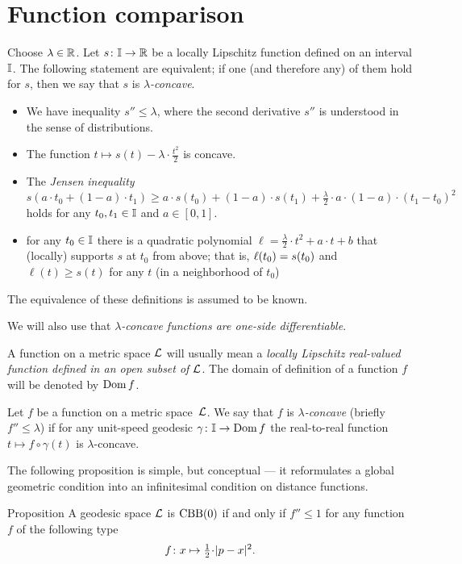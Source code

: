 \section{Function comparison}\label{Function comparison}

Choose $\lambda\in \mathbb{R}$.
Let $s\colon\mathbb{I}\to\mathbb{R}$ be a locally Lipschitz function defined on an interval $\mathbb{I}$.
The following statement are equivalent;
if one (and therefore any) of them hold for $s$, then we say that $s$ is \emph{$\lambda$-concave}.
\begin{itemize}
\item We have inequality $s''\le \lambda$, where the second derivative $s''$ is understood in the sense of distributions.
\item The function $t\mapsto s(t)-\lambda\cdot\tfrac{t^2}2$ is concave.
\item The \emph{Jensen inequality}
\[s(a\cdot t_0+(1-a)\cdot t_1)\ge a\cdot s(t_0)+(1-a)\cdot s(t_1)+\tfrac\lambda2\cdot a\cdot(1-a)\cdot(t_1-t_0)^2 \]
holds for any $t_0,t_1\in \mathbb{I}$ and $a\in[0,1]$.
\item for any $t_0\in \mathbb{I}$ there is a quadratic polynomial $\ell=\tfrac\lambda2\cdot t^2+a\cdot t+b$ that (locally) supports $s$ at $t_0$ from above;
that is, $\ell(t_0)\z= s(t_0)$ and $\ell(t)\ge s(t)$ for any $t$ (in a neighborhood of $t_0$)
\end{itemize}

The equivalence of these definitions is assumed to be known.

We will also use that \textit{$\lambda$-concave functions are one-side differentiable}.

A function on a metric space $\mathcal{L}$ will usually mean a \textit{locally Lipschitz real-valued function defined in an open subset of $\mathcal{L}$}.
The domain of definition of a function $f$ will be denoted by $\mathop{\rm Dom}\nolimits f$.

Let $f$ be a function on a metric space~$\mathcal{L}$.
We say that $f$ is \emph{$\lambda$-concave} (briefly $f''\le \lambda$) if 
for any unit-speed geodesic $\gamma\:\II\z\to \Dom f$
the real-to-real function $t\mapsto f\circ\gamma(t)$ is $\lambda$-concave.

The following proposition is simple, but conceptual ---
it reformulates a global geometric condition into an infinitesimal condition on distance functions.

\begin{thm}{Proposition}\label{comp-kappa}
A geodesic space $\mathcal{L}$ is $\mathrm{CBB}(0)$ if and only if $f''\le 1$ for any function $f$ of the following type 
\[f\:x\mapsto \tfrac12\cdot\dist[2]{p}{x}{}.\] 
\end{thm} 

